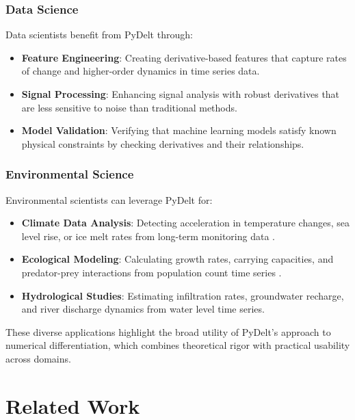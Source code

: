 \documentclass[11pt,a4paper]{article}
\begin{document}
\subsubsection{Data Science}

Data scientists benefit from PyDelt through:

\begin{itemize}
    \item \textbf{Feature Engineering}: Creating derivative-based features that capture rates of change and higher-order dynamics in time series data.
    
    \item \textbf{Signal Processing}: Enhancing signal analysis with robust derivatives that are less sensitive to noise than traditional methods.
    
    \item \textbf{Model Validation}: Verifying that machine learning models satisfy known physical constraints by checking derivatives and their relationships.
\end{itemize}

\subsubsection{Environmental Science}

Environmental scientists can leverage PyDelt for:

\begin{itemize}
    \item \textbf{Climate Data Analysis}: Detecting acceleration in temperature changes, sea level rise, or ice melt rates from long-term monitoring data \citep{piao2020characteristics}.
    
    \item \textbf{Ecological Modeling}: Calculating growth rates, carrying capacities, and predator-prey interactions from population count time series \citep{clark2001ecological}.
    
    \item \textbf{Hydrological Studies}: Estimating infiltration rates, groundwater recharge, and river discharge dynamics from water level time series.
\end{itemize}

These diverse applications highlight the broad utility of PyDelt's approach to numerical differentiation, which combines theoretical rigor with practical usability across domains.

\section{Related Work}
\end{document}
